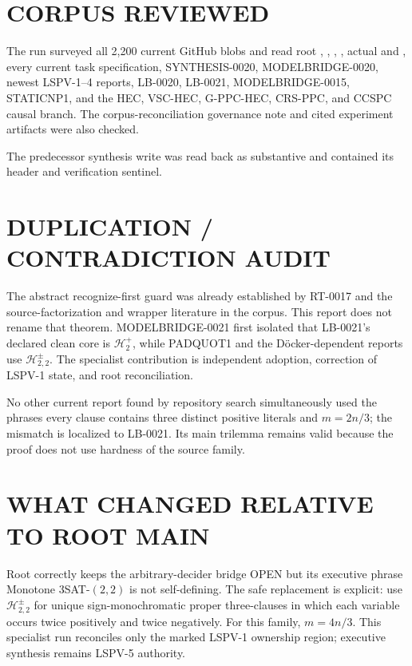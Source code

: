 \documentclass[11pt]{article}
\newcommand{\Hplus}{\mathcal H^{+}_{2}}
\newcommand{\Hsigned}{\mathcal H^{\pm}_{2,2}}
\begin{document}
\section{CORPUS REVIEWED}

The run surveyed all 2,200 current GitHub blobs and read root
, , ,
, actual
 and , every current task specification,
SYNTHESIS-0020, MODELBRIDGE-0020, newest LSPV-1--4 reports, LB-0020,
LB-0021, MODELBRIDGE-0015, STATICNP1, and the HEC, VSC-HEC, G-PPC-HEC,
CRS-PPC, and CCSPC causal branch.  The corpus-reconciliation governance
note and cited experiment artifacts were also checked.

The predecessor synthesis write
was read back as substantive and contained its header and verification
sentinel.

\section{DUPLICATION / CONTRADICTION AUDIT}

The abstract recognize-first guard was already established by RT-0017 and
the source-factorization and wrapper literature in the corpus.  This report does not rename that theorem.  MODELBRIDGE-0021 first isolated
that LB-0021's declared clean core is $\Hplus$, while PADQUOT1 and the
D\"ocker-dependent reports use $\Hsigned$.  The specialist contribution is
independent adoption, correction of LSPV-1 state, and root reconciliation.

No other current report found by repository search simultaneously used the
phrases every clause contains three distinct positive literals and
$m=2n/3$; the mismatch is localized to LB-0021.  Its main trilemma remains
valid because the proof does not use hardness of the source family.

\section{WHAT CHANGED RELATIVE TO ROOT MAIN}

Root  correctly keeps the arbitrary-decider bridge OPEN but
its executive phrase Monotone $3$SAT-$(2,2)$ is not self-defining.
The safe replacement is explicit: use $\mathcal H^{\pm}_{2,2}$ for unique
sign-monochromatic proper three-clauses in which each variable occurs
twice positively and twice negatively.  For this family, $m=4n/3$.
This specialist run reconciles only the marked LSPV-1 ownership region; executive synthesis remains LSPV-5 authority.
\end{document}
